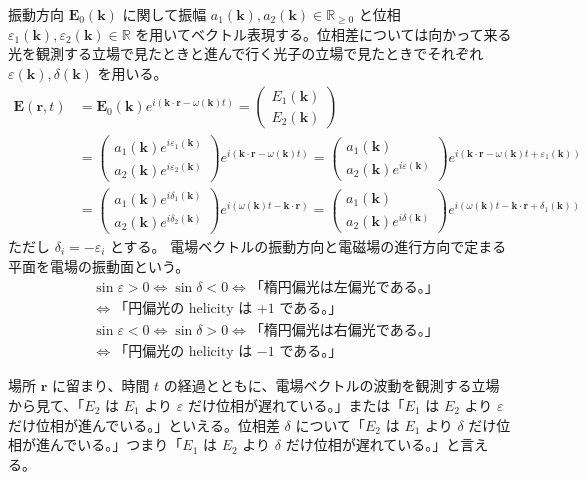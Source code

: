 \documentclass[uplatex,dvipdfmx,a4paper,11pt]{jlreq}
\newcommand{\RR}{\mathbb{R}}
\newcommand{\EE}{\bm{E}}
\newcommand{\rr}{\bm{r}}
\newcommand{\kk}{\bm{k}}
\theoremstyle{definition}
\begin{document}
\begin{definition}[偏光]
  振動方向 $\EE_0(\kk)$ に関して振幅 $a_1(\kk), a_2(\kk)\in\RR_{\geq 0}$ と位相 $\varepsilon_1(\kk), \varepsilon_2(\kk)\in\RR$ を用いてベクトル表現する。位相差については向かって来る光を観測する立場で見たときと進んで行く光子の立場で見たときでそれぞれ $\varepsilon(\kk), \delta(\kk)$ を用いる。
  \begin{align}
    \EE(\rr, t) & = \EE_0(\kk)e^{i(\kk\cdot\rr - \omega(\kk)t)}
    = \begin{pmatrix}
        E_1(\kk) \\
        E_2(\kk)
      \end{pmatrix}                                                    \\
                & = \begin{pmatrix}
                      a_1(\kk)e^{i\varepsilon_1(\kk)} \\
                      a_2(\kk)e^{i\varepsilon_2(\kk)}
                    \end{pmatrix}e^{i(\kk\cdot\rr - \omega(\kk)t)}
    =
    \begin{pmatrix}
      a_1(\kk) \\
      a_2(\kk)e^{i\varepsilon(\kk)}
    \end{pmatrix}e^{i(\kk\cdot\rr - \omega(\kk)t + \varepsilon_1(\kk))} \\
                & =
    \begin{pmatrix}
      a_1(\kk)e^{i\delta_1(\kk)} \\
      a_2(\kk)e^{i\delta_2(\kk)}
    \end{pmatrix}e^{i(\omega(\kk)t - \kk\cdot\rr)}
    =
    \begin{pmatrix}
      a_1(\kk) \\
      a_2(\kk)e^{i\delta(\kk)}
    \end{pmatrix}e^{i(\omega(\kk)t - \kk\cdot\rr + \delta_1(\kk))}
  \end{align}
  ただし $\delta_i = - \varepsilon_i$ とする。
  電場ベクトルの振動方向と電磁場の進行方向で定まる平面を電場の振動面という。
  \begin{align}
     & \sin\varepsilon > 0 \iff \sin\delta < 0 \iff \text{「楕円偏光は左偏光である。」} \\
     & \iff \text{「円偏光の helicity は $+1$ である。」}                            \\
     & \sin\varepsilon < 0 \iff \sin\delta > 0 \iff \text{「楕円偏光は右偏光である。」} \\
     & \iff \text{「円偏光の helicity は $-1$ である。」}
  \end{align}
\end{definition}
\begin{proposition}
  場所 $\rr$ に留まり、時間 $t$ の経過とともに、電場ベクトルの波動を観測する立場から見て、「$E_2$ は $E_1$ より $\varepsilon$ だけ位相が遅れている。」または「$E_1$ は $E_2$ より $\varepsilon$ だけ位相が進んでいる。」といえる。位相差 $\delta$ について「$E_2$ は $E_1$ より $\delta$ だけ位相が進んでいる。」つまり「$E_1$ は $E_2$ より $\delta$ だけ位相が遅れている。」と言える。
\end{proposition}
\end{document}
